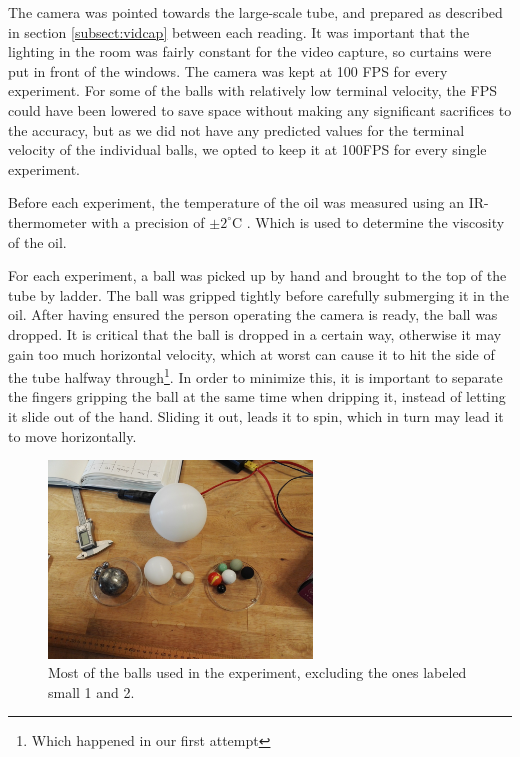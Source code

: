 \documentclass[11pt,a4paper]{article}
\begin{document}
    The camera was pointed towards the large-scale tube, and prepared as described in section \ref{subsect:vidcap} between each reading. It was important that the lighting in the room was fairly constant for the video capture, so curtains were put in front of the windows. The camera was kept at 100 FPS for every experiment. For some of the balls with relatively low terminal velocity, the FPS could have been lowered to save space without making any significant sacrifices to the accuracy, but as we did not have any predicted values for the terminal velocity of the individual balls, we opted to keep it at 100FPS for every single experiment.

    Before each experiment, the temperature of the oil was measured using an IR-thermometer with a precision of $\pm2^\circ$C \cite{_fluke_????}. Which is used to determine the viscosity of the oil.

    For each experiment, a ball was picked up by hand and brought to the top of the tube by ladder. The ball was gripped tightly before carefully submerging it in the oil. After having ensured the person operating the camera is ready, the ball was dropped. It is critical that the ball is dropped in a certain way, otherwise it may gain too much horizontal velocity, which at worst can cause it to hit the side of the tube halfway through\footnote{Which happened in our first attempt}. In order to minimize this, it is important to separate the fingers gripping the ball at the same time when dripping it, instead of letting it slide out of the hand. Sliding it out, leads it to spin, which in turn may lead it to move horizontally.

    \begin{figure}[H]
      \center
      \includegraphics[width=7cm]{scripts/figs/IMG_20180321_131204.jpg}
      \caption{Most of the balls used in the experiment, excluding the ones labeled small 1 and 2.}
      \label{fig:balls}
    \end{figure}
\end{document}
